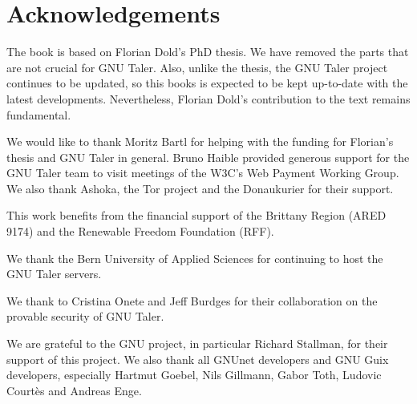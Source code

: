\chapter*{Acknowledgements}

The book is based on Florian Dold's PhD thesis. We have removed the parts that
are not crucial for GNU Taler. Also, unlike the thesis, the GNU Taler project
continues to be updated, so this books is expected to be kept up-to-date with
the latest developments.  Nevertheless, Florian Dold's contribution to the
text remains fundamental.

We would like to thank Moritz Bartl for helping with the funding for Florian's
thesis and GNU Taler in general.  Bruno Haible provided generous support for
the GNU Taler team to visit meetings of the W3C's Web Payment Working Group.
We also thank Ashoka, the Tor project and the Donaukurier for their support.

This work benefits from the financial support of the Brittany Region (ARED
9174) and the Renewable Freedom Foundation (RFF).  

We thank the Bern University of Applied Sciences for continuing to host the
GNU Taler servers.

We thank to Cristina Onete and Jeff Burdges for their collaboration on the
provable security of GNU Taler.

We are grateful to the GNU project, in particular Richard Stallman, for their
support of this project.  We also thank all GNUnet developers and GNU Guix
developers, especially Hartmut Goebel, Nils Gillmann, Gabor Toth, Ludovic
Courtès and Andreas Enge.

